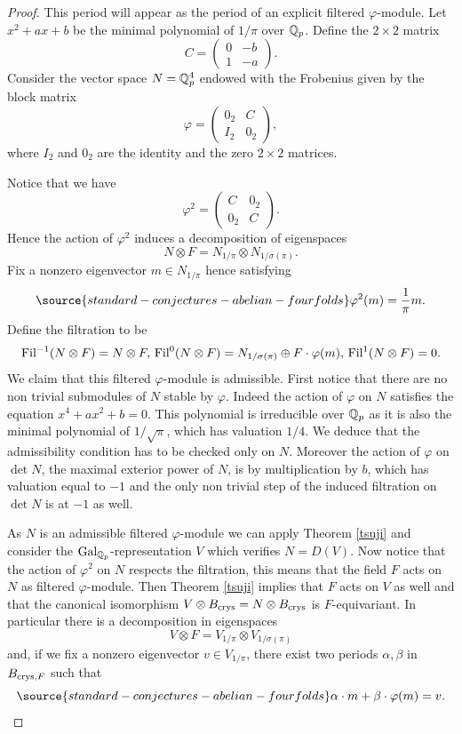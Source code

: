 \begin{proof}
This period will appear as the period of an explicit filtered $\varphi$-module. Let $x^2+ax+b$ be the minimal polynomial of $1/\pi$ over $\mathbb{Q}_p$.  Define the $2 \times 2$ matrix
\[
C =  \begin{pmatrix} 0 & -b \\
1 & -a
 \end{pmatrix}.
 \]
 Consider the vector space  $N=\mathbb{Q}_p^4$  endowed with the Frobenius given by the block matrix
 \[
\varphi =  \begin{pmatrix} 0_2 & C \\
I_2 & 0_2
 \end{pmatrix},
 \]
where $I_2$ and $0_2$ are the identity and the zero $2 \times 2$  matrices.

 Notice  that we have \[
\varphi^2 =  \begin{pmatrix} C & 0_2 \\
0_2 & C
 \end{pmatrix}.
 \]
 Hence the action of $\varphi^2$ induces a decomposition of eigenspaces
  \[N \otimes F=N_{1/\pi}\otimes N_{1/\sigma(\pi)}.\]
 Fix a nonzero eigenvector $m \in N_{1/\pi}$ hence satisfying
 \begin{equation}\label{troilo}
\source{standard-conjectures-abelian-fourfolds}
\varphi^2 (m)=  \frac{1}{\pi} m.
 \end{equation}
Define the filtration to be \[\textnormal{Fil}^{-1} (N\otimes F)=N\otimes F, \, \textnormal{Fil}^0 (N\otimes F)= N_{1/\sigma(\pi)}\oplus F\cdot \varphi (m ) , \, \textnormal{Fil}^{1} (N\otimes F)=0.\]
We claim that this filtered $\varphi$-module is admissible. First notice that there are no non trivial submodules of $N$ stable by $\varphi$. Indeed the action of $\varphi$ on $N$ satisfies the equation $x^4+ax^2+b=0$. This polynomial is irreducible over $\mathbb{Q}_p$ as it is also the minimal polynomial of $1/\sqrt{\pi}$, which has valuation $1/4$.
 We deduce that the admissibility condition has to be checked only on $N$. Moreover the action of $\varphi$ on $\det N$, the maximal exterior power of $N$, is by multiplication by $b$, which has valuation equal to $-1$ and the only non trivial step of the induced filtration on $\det N$ is at $-1$ as well.

As $N$ is an admissible filtered $\varphi$-module we can apply Theorem \ref{tsuji} and consider the $\textnormal{Gal}_{\mathbb{Q}_p}$-representation $V$ which verifies  $N=D(V)$.
Now notice that the action of $\varphi^2$ on $N$ respects the filtration, this means that the field $F$ acts on $N$ as filtered $\varphi$-module.
Then Theorem \ref{tsuji}  implies that
 $F$ acts on $V$ as well and that the canonical isomorphism  $V \otimes B_{\textnormal{crys}}= N \otimes B_{\textnormal{crys}}$ is $F$-equivariant. In particular there is a decomposition in eigenspaces
 \[V \otimes F=V_{1/\pi}\otimes V_{1/\sigma(\pi)}\]
 and, if we fix  a nonzero eigenvector $v \in V_{1/\pi}$, there exist two periods $\alpha, \beta$ in $B_{\textnormal{crys},F}$ such that
  \begin{equation}\label{troilo2}
\source{standard-conjectures-abelian-fourfolds}
\alpha \cdot m+ \beta \cdot \varphi(m)=   v.
 \end{equation}


\end{proof}
